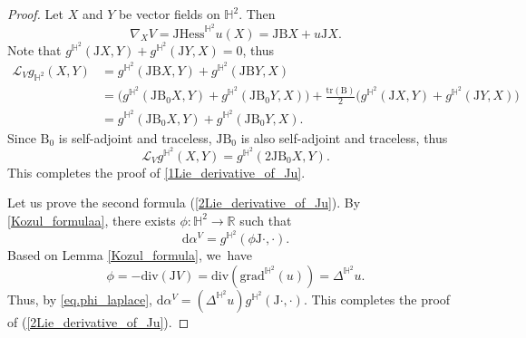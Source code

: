 \documentclass[11pt]{article}
\theoremstyle{plain}
\theoremstyle{definition}
\newcommand{\grad}{\mathrm{grad}^{\mathbb{H}^2}}
\newcommand{\hess}{\mathrm{Hess}^{\mathbb{H}^2}}
\newcommand{\J}{\mathrm{J}}
\newcommand{\B}{\mathrm{B}}
\begin{document}
\begin{proof}
Let $X$ and $Y$ be vector fields on $\mathbb{H}^2$. Then
\[
\nabla_XV=\J\hess u(X)=\J \B X+u\J X.
\]
Note that $g^{\mathbb{H}^2}(\J X,Y)+g^{\mathbb{H}^2}(\J Y,X)=0$, thus
\begin{align*}
\mathcal{L}_Vg_{\mathbb{H}^2}(X,Y)&=g^{\mathbb{H}^2}(\J\B X,Y)+g^{\mathbb{H}^2}(\J\B Y,X)\\
&=\big(g^{\mathbb{H}^2}(\J\B_0 X,Y)+g^{\mathbb{H}^2}(\J\B_0 Y,X)\big)+ \frac{\mathrm{tr}(\B)}{2}\big(g^{\mathbb{H}^2}(\J X,Y)+g^{\mathbb{H}^2}(\J Y,X)\big)\\
&=g^{\mathbb{H}^2}(\J\B_0 X,Y)+g^{\mathbb{H}^2}(\J\B_0 Y,X).
\end{align*}
Since $\B_0$ is self-adjoint and traceless, $\J\B_0 $ is also self-adjoint and traceless, thus
\begin{equation}\label{eq_50_rough_for_divergence_free}
\mathcal{L}_Vg^{\mathbb{H}^2}(X,Y)=g^{\mathbb{H}^2}(2\J\B_0 X,Y).
\end{equation} This completes the proof of \eqref{1Lie_derivative_of_Ju}.

Let us prove the second formula (\ref{2Lie_derivative_of_Ju}). By \eqref{Kozul_formulaa}, there exists \(\phi : \mathbb{H}^2 \to \mathbb{R}\) such that
\begin{equation}\label{eq.phi_laplace}
\mathrm{d}\alpha^V = g^{\mathbb{H}^2}(\phi \J \cdot, \cdot).
\end{equation}
Based on Lemma \ref{Kozul_formula}, we~have
\[ \phi = -\mathrm{div}(\J V) = \mathrm{div}(\grad(u)) =
\Delta^{\mathbb{H}^2} u. \]
Thus, by \eqref{eq.phi_laplace}, \(\mathrm{d}\alpha^V =
(\Delta^{\mathbb{H}^2} u) g^{\mathbb{H}^2}(\J \cdot, \cdot)\). This
completes the proof of (\ref{2Lie_derivative_of_Ju}).


\end{proof}
\end{document}
